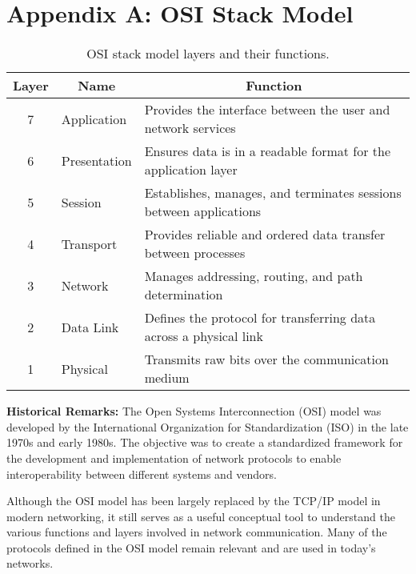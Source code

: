\renewcommand{\thefigure}{A\arabic{figure}}
\renewcommand{\thetable}{A\arabic{table}}
\setcounter{figure}{0}
\setcounter{table}{0}

\clearpage
\section{Appendix A: OSI Stack Model}
\label{appendixA}
{
\setlength{\tabcolsep}{8pt}

\begin{table}[h!]
    \centering
    \captionsetup{justification=centering}
    \begin{tabularx}{\textwidth}{clX}
        \toprule
        \textbf{Layer} & \multicolumn{1}{c}{\textbf{Name}} & \multicolumn{1}{c}{\textbf{Function}} \\
        \midrule
        7 & Application & Provides the interface between the user and network services \\
        6 & Presentation & Ensures data is in a readable format for the application layer \\
        5 & Session & Establishes, manages, and terminates sessions between applications \\
        4 & Transport & Provides reliable and ordered data transfer between processes \\
        3 & Network & Manages addressing, routing, and path determination \\
        2 & Data Link & Defines the protocol for transferring data across a physical link \\
        1 & Physical & Transmits raw bits over the communication medium \\
        \bottomrule
    \end{tabularx}
    \caption{OSI stack model layers and their functions.}
    \label{tab:osi_layers}
\end{table}
}

\noindent \textbf{Historical Remarks:} The Open Systems Interconnection (OSI) model was developed by the International Organization for Standardization (ISO) in the late 1970s and early 1980s. The objective was to create a standardized framework for the development and implementation of network protocols to enable interoperability between different systems and vendors.

Although the OSI model has been largely replaced by the TCP/IP model in modern networking, it still serves as a useful conceptual tool to understand the various functions and layers involved in network communication. Many of the protocols defined in the OSI model remain relevant and are used in today's networks.

